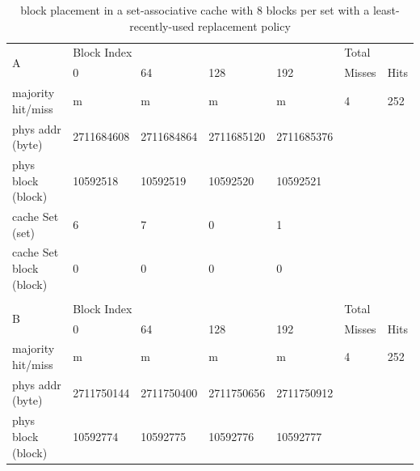 \documentclass[12pt]{article}
\begin{document}
\begin{table}[H]
\centering
\caption{block placement in a set-associative cache with 8 blocks per set with a least-recently-used replacement policy}
\begin{tabular}{lllllll}
\multicolumn{1}{l|}{\multirow{2}{*}{A}}      & \multicolumn{4}{l|}{Block Index}                                       & \multicolumn{2}{l}{Total}  \\
\multicolumn{1}{l|}{}                        & 0          & 64         & 128        & \multicolumn{1}{l|}{192}        & Misses        & Hits       \\ \cline{1-6}
\multicolumn{1}{l|}{majority hit/miss}       & m          & m          & m          & \multicolumn{1}{l|}{m}          & 4             & 252        \\
\multicolumn{1}{l|}{phys addr (byte)}        & 2711684608 & 2711684864 & 2711685120 & \multicolumn{1}{l|}{2711685376} &               &            \\
\multicolumn{1}{l|}{phys block (block)}      & 10592518   & 10592519   & 10592520   & \multicolumn{1}{l|}{10592521}   &               &            \\
\multicolumn{1}{l|}{cache Set (set)}         & 6          & 7          & 0          & \multicolumn{1}{l|}{1}          &               &            \\
\multicolumn{1}{l|}{cache Set block (block)} & 0          & 0          & 0          & \multicolumn{1}{l|}{0}          &               &            \\
                                             &            &            &            &                                 &               &            \\
\multicolumn{1}{l|}{\multirow{2}{*}{B}}      & \multicolumn{4}{l|}{Block Index}                                       & \multicolumn{2}{l}{Total}  \\
\multicolumn{1}{l|}{}                        & 0          & 64         & 128        & \multicolumn{1}{l|}{192}        & Misses        & Hits       \\ \hline
\multicolumn{1}{l|}{majority hit/miss}       & m          & m          & m          & \multicolumn{1}{l|}{m}          & 4             & 252        \\
\multicolumn{1}{l|}{phys addr (byte)}        & 2711750144 & 2711750400 & 2711750656 & \multicolumn{1}{l|}{2711750912} &               &            \\
\multicolumn{1}{l|}{phys block (block)}      & 10592774   & 10592775   & 10592776   & \multicolumn{1}{l|}{10592777}   &               &            \\

\end{tabular}
\end{table}
\end{document}
